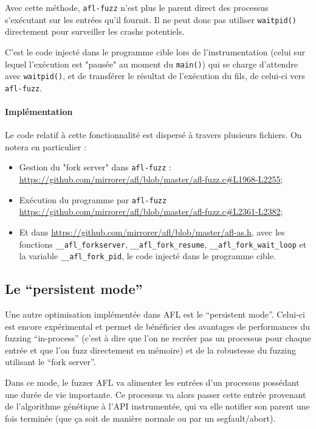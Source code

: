 Avec cette méthode, \lstinline{afl-fuzz} n'est plus le parent direct des processus s'exécutant sur les entrées qu'il fournit.
Il ne peut donc pas utiliser \lstinline{waitpid()} directement pour surveiller les crashs potentiels.

C'est le code injecté dans le programme cible lors de l'instrumentation (celui sur lequel l'exécution est "pausée" au moment du \lstinline{main()}) qui se charge d'attendre avec \lstinline{waitpid()}, et de transférer le résultat de l'exécution du fils, de celui-ci vers \lstinline{afl-fuzz}.

\paragraph{Implémentation}

Le code relatif à cette fonctionnalité est dispersé à travers plusieurs fichiers.
On notera en particulier :
\begin{itemize}
  \item{} Gestion du "fork server" dans \lstinline{afl-fuzz} : \url{https://github.com/mirrorer/afl/blob/master/afl-fuzz.c#L1968-L2255};
  \item{} Exécution du programme par \lstinline{afl-fuzz} \url{https://github.com/mirrorer/afl/blob/master/afl-fuzz.c#L2361-L2382};
  \item{} Et dans \url{https://github.com/mirrorer/afl/blob/master/afl-as.h}, avec les fonctions \lstinline{__afl_forkserver}, \lstinline{__afl_fork_resume}, \lstinline{__afl_fork_wait_loop} et la variable \lstinline{__afl_fork_pid}, le code injecté dans le programme cible.
\end{itemize}

\subsection{Le ``persistent mode''}\label{persistent-mode}

Une autre optimisation implémentée dans AFL est le ``persistent mode''.
Celui-ci est encore expérimental et permet de bénéficier des avantages de performances du fuzzing ``in-process'' (c'est à dire que l'on ne recréer pas un processus pour chaque entrée et que l'on fuzz directement en mémoire) et de la robustesse du fuzzing utilisant le ``fork server''.

Dans ce mode, le fuzzer AFL va alimenter les entrées d'un processus possédant une durée de vie importante.
Ce processus va alors passer cette entrée provenant de l'algorithme génétique à l'API instrumentée, qui va elle notifier son parent une fois terminée (que ça soit de manière normale ou par un segfault/abort).

